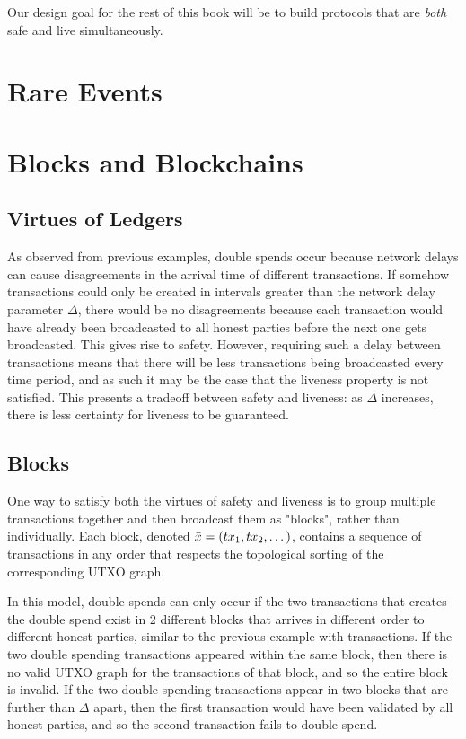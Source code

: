 Our design goal for the rest of this book will be to build protocols that
are \emph{both} safe and live simultaneously.

\section{Rare Events}

\section{Blocks and Blockchains}
\subsection{Virtues of Ledgers}

As observed from previous examples, double spends occur because network delays can cause disagreements in the arrival time of different transactions. If somehow transactions could only be created in intervals greater than the network delay parameter $\Delta$, there would be no disagreements because each transaction would have already been broadcasted to all honest parties before the next one gets broadcasted. This gives rise to safety. However, requiring such a delay between transactions means that there will be less transactions being broadcasted every time period, and as such it may be the case that the liveness property is not satisfied. This presents a tradeoff between safety and liveness: as $\Delta$ increases, there is less certainty for liveness to be guaranteed.

\subsection{Blocks}

One way to satisfy both the virtues of safety and liveness is to group multiple transactions together and then broadcast them as "blocks", rather than individually. Each block, denoted $\Bar{x} = (tx_1, tx_2, \dots)$, contains a sequence of transactions in any order that respects the topological sorting of the corresponding UTXO graph.

In this model, double spends can only occur if the two transactions that creates the double spend exist in 2 different blocks that arrives in different order to different honest parties, similar to the previous example with transactions. If the two double spending transactions appeared within the same block, then there is no valid UTXO graph for the transactions of that block, and so the entire block is invalid. If the two double spending transactions appear in two blocks that are further than $\Delta$ apart, then the first transaction would have been validated by all honest parties, and so the second transaction fails to double spend.

